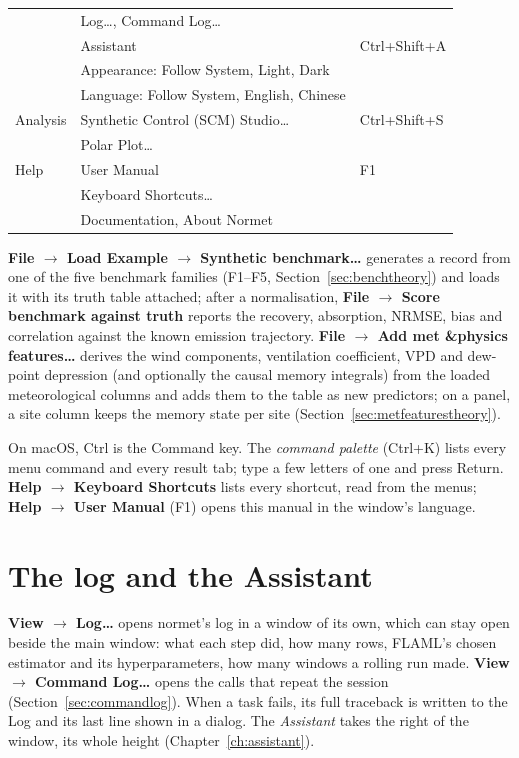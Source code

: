 \documentclass[11pt]{report}
\newcommand{\nm}{\textsf{normet}}
\newcommand{\tab}[1]{\textbf{#1}}
\begin{document}
\begin{center}
\begin{tabular}{@{}lll@{}}
         & Log\ldots, Command Log\ldots       & \\
         & Assistant                            & Ctrl+Shift+A \\
         & Appearance: Follow System, Light, Dark & \\
         & Language: Follow System, English, Chinese & \\
Analysis & Synthetic Control (SCM) Studio\ldots & Ctrl+Shift+S \\
         & Polar Plot\ldots                     & \\
Help     & User Manual                          & F1 \\
         & Keyboard Shortcuts\ldots             & \\
         & Documentation, About Normet          & \\
\bottomrule
\end{tabular}
\end{center}
\tab{File $\rightarrow$ Load Example $\rightarrow$ Synthetic benchmark\ldots} generates
a record from one of the five benchmark families (F1--F5,
Section~\ref{sec:benchtheory}) and loads it with its truth table attached; after a
normalisation, \tab{File $\rightarrow$ Score benchmark against truth} reports the
recovery, absorption, NRMSE, bias and correlation against the known emission
trajectory. \tab{File $\rightarrow$ Add met \&physics features\ldots} derives the wind
components, ventilation coefficient, VPD and dew-point depression (and optionally the
causal memory integrals) from the loaded meteorological columns and adds them to the
table as new predictors; on a panel, a site column keeps the memory state per site
(Section~\ref{sec:metfeaturestheory}).

On macOS, Ctrl is the Command key. The \emph{command palette} (Ctrl+K) lists every
menu command and every result tab; type a few letters of one and press Return.
\tab{Help $\rightarrow$ Keyboard Shortcuts} lists every shortcut, read from the menus;
\tab{Help $\rightarrow$ User Manual} (F1) opens this manual in the window's language.

\section{The log and the Assistant}
\tab{View $\rightarrow$ Log\ldots} opens \nm{}'s log in a window of its own, which can
stay open beside the main window: what each step did, how many rows, FLAML's chosen
estimator and its hyperparameters, how many windows a rolling run made.
\tab{View $\rightarrow$ Command Log\ldots} opens the calls that repeat the session
(Section~\ref{sec:commandlog}). When a task fails, its full traceback is written to the
Log and its last line shown in a dialog. The \emph{Assistant} takes the right of the
window, its whole height (Chapter~\ref{ch:assistant}).
\end{document}
